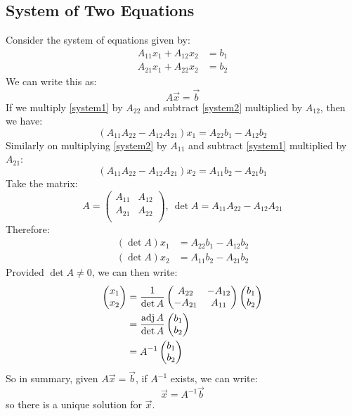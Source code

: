 \documentclass[../main.tex]{subfiles}
\begin{document}
\subsection{System of Two Equations}
Consider the system of equations given by:
\begin{align}
  A_{1 1}x_1 + A_{1 2}x_2 &= b_1 \tag{\textasteriskcentered}\label{system1}\\
  A_{2 1}x_1 + A_{2 2}x_2 &= b_2 \tag{$\dagger$}\label{system2}
\end{align}
We can write this as:
\[
  A\vec{x} = \vec{b}
\]
If we multiply \cref{system1} by $A_{2 2}$ and subtract \cref{system2} multiplied by $A_{1 2}$, then we have:
\[
  (A_{1 1}A_{2 2} - A_{1 2}A_{2 1})x_1 = A_{2 2}b_1 - A_{1 2}b_2
\]
Similarly on multiplying \cref{system2} by $A_{1 1}$ and subtract \cref{system1} multiplied by $A_{2 1}$:
\[
  (A_{1 1}A_{2 2} - A_{1 2}A_{2 1})x_2 = A_{1 1}b_2 - A_{2 1}b_1
\]
Take the matrix:
\[
  A = \begin{pmatrix}
  A_{1 1} & A_{1 2} \\
  A_{2 1} & A_{2 2} \\
  \end{pmatrix},\
  \det A = A_{1 1}A_{2 2} - A_{1 2}A_{2 1}
\]
Therefore:
\begin{align*}
  (\det A)x_1 &= A_{2 2}b_1 - A_{1 2}b_2 \\
  (\det A)x_2 &= A_{1 1}b_2 - A_{2 1}b_2
\end{align*}
Provided $\det A \neq 0$, we can then write:
\begin{align*}
  \begin{pmatrix}
  x_1 \\
  x_2 \\
  \end{pmatrix}
  &= \frac{1}{\det A}
  \begin{pmatrix}
  A_{2 2} & -A_{1 2} \\
  -A_{2 1} & A_{1 1} \\
  \end{pmatrix}
  \begin{pmatrix}
  b_1 \\
  b_2 \\
  \end{pmatrix} \\
  &= \frac{\operatorname{adj} A}{\det A}
  \begin{pmatrix}
  b_1 \\
  b_2 \\
  \end{pmatrix} \\
  &= A^{-1}
  \begin{pmatrix}
  b_1 \\
  b_2 \\
  \end{pmatrix}
\end{align*}
So in summary, given $A\vec{x} = \vec{b}$, if $A^{-1}$ exists, we can write:
\[
  \vec{x} = A^{-1} \vec{b}
\]
so there is a unique solution for $\vec{x}$.
\end{document}
